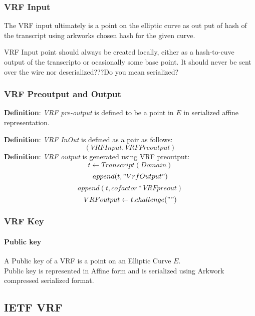 \documentclass[
]{article}
\begin{document}
\hypertarget{vrf-input}{%
\subsubsection{VRF Input}\label{vrf-input}}

The VRF input ultimately is a point on the elliptic curve as out put of
hash of the transcript using arkworks chosen hash for the given curve.

VRF Input point should always be created locally, either as a
hash-to-cuve output of the transcripto or ocasionally some base point.
It should never be sent over the wire nor deserialized???Do you mean
serialized?

\hypertarget{vrf-preoutput-and-output}{%
\subsubsection{VRF Preoutput and
Output}\label{vrf-preoutput-and-output}}

\textbf{Definition}: \emph{VRF pre-output} is defined to be a point in
\(E\) in serialized affine representation.

\textbf{Definition}: \emph{VRF InOut} is defined as a pair as follows:
\[(VRF Input, VRF Preoutput)\] \textbf{Definition}: \emph{VRF output} is
generated using VRF preoutput: \[ t \leftarrow Transcript(Domain) \]
\[ append(t, "VrfOutput") \] \[ append(t, cofactor * VRFpreout) \]
\[ VRFoutput \leftarrow t.challenge("") \]

\hypertarget{vrf-key}{%
\subsubsection{VRF Key}\label{vrf-key}}

\hypertarget{public-key}{%
\paragraph{\texorpdfstring{Public key\\
}{Public key }}\label{public-key}}

\hfill\break
A Public key of a VRF is a point on an Elliptic Curve \(E\).\\
Public key is represented in Affine form and is serialized using Arkwork
compressed serialized format.

\hypertarget{ietf-vrf}{%
\subsection{IETF VRF}\label{ietf-vrf}}
\end{document}
